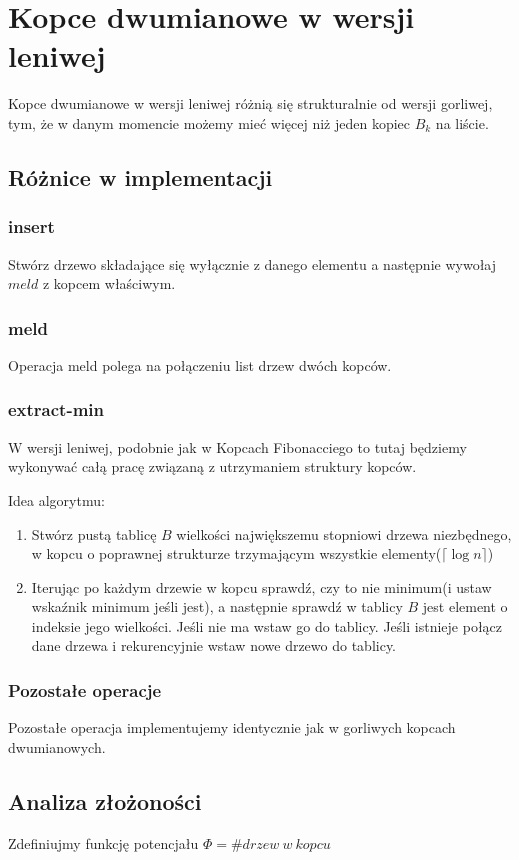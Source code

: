 \section{Kopce dwumianowe w wersji leniwej}
Kopce dwumianowe w wersji leniwej różnią się strukturalnie od wersji gorliwej, tym, że w danym momencie możemy mieć więcej niż jeden kopiec $B_k$ na liście.
\subsection{Różnice w implementacji}

\subsubsection{insert}
Stwórz drzewo składające się wyłącznie z danego elementu a następnie wywołaj $meld$ z kopcem właściwym.
\subsubsection{meld}
Operacja meld polega na połączeniu list drzew dwóch kopców.
\subsubsection{extract-min}
W wersji leniwej, podobnie jak w Kopcach Fibonacciego
to tutaj będziemy wykonywać całą pracę związaną z utrzymaniem struktury kopców.

Idea algorytmu:
\begin{enumerate}
 \item Stwórz pustą tablicę $B$ wielkości największemu stopniowi drzewa niezbędnego, w kopcu o poprawnej strukturze trzymającym wszystkie elementy($\lceil \log n \rceil$)
 \item Iterując po każdym drzewie w kopcu sprawdź, czy to nie minimum(i ustaw wskaźnik minimum jeśli jest),
      a następnie sprawdź w tablicy $B$ jest element o indeksie jego wielkości.
      Jeśli nie ma wstaw go do tablicy. Jeśli istnieje połącz dane drzewa i rekurencyjnie wstaw nowe drzewo do tablicy.
\end{enumerate}

\subsubsection{Pozostałe operacje}
Pozostałe operacja implementujemy identycznie jak w gorliwych kopcach dwumianowych.

\subsection{Analiza złożoności}
Zdefiniujmy funkcję potencjału $\Phi = \#drzew~w~kopcu$

